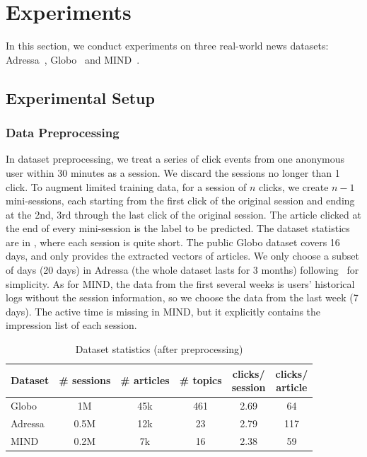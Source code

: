 \section{Experiments}
\label{sec:experiment}
In this section, we conduct experiments on three real-world news datasets: 
Adressa~\cite{gulla_adressa_2017}, Globo~\cite{gabriel2019contextual,moreira_news_2018} and MIND~\cite{wu2020mind}. 

\subsection{Experimental Setup}
\subsubsection{Data Preprocessing}
In dataset preprocessing, we treat a series of click events from one anonymous user 
within 30 minutes as a session. 
We discard the sessions no longer than 1 click.
To augment limited training data, for a session of $n$ clicks, we create $n-1$ mini-sessions, 
each starting from the first click of the original session and ending at the 2nd, 3rd through
the last click of the original session. The article clicked at the end of every mini-session is 
the label to be predicted. The dataset statistics are 
in , where each session is quite short. The public Globo dataset covers 16 days, and only provides the extracted vectors of articles. We only choose a subset of days (20 days)
in Adressa (the whole dataset lasts for 3 months) following~\cite{gabriel2019contextual} 
for simplicity. As for MIND, the data from the first several weeks is 
users' historical logs without the session information, so we choose the data from the last week (7 days). The active time is missing in MIND, but it explicitly contains the impression list of each session.

\begin{table}[th]
  \caption{Dataset statistics (after preprocessing)}
  \label{tb:dataset}
  \centering
  \begin{tabular}{l|c|c|c|c|c}
    \toprule
     Dataset & \# sessions & \# articles & \# topics & \tabincell{c}{clicks/\\session}  & \tabincell{c}{clicks/\\article} \\
    \midrule
    Globo & 1M & 45k & 461 & 2.69 & 64  \\
    Adressa & 0.5M & 12k & 23 & 2.79 & 117 \\
    MIND & 0.2M & 7k & 16 & 2.38 & 59 \\
    \bottomrule
  \end{tabular}
\end{table}

